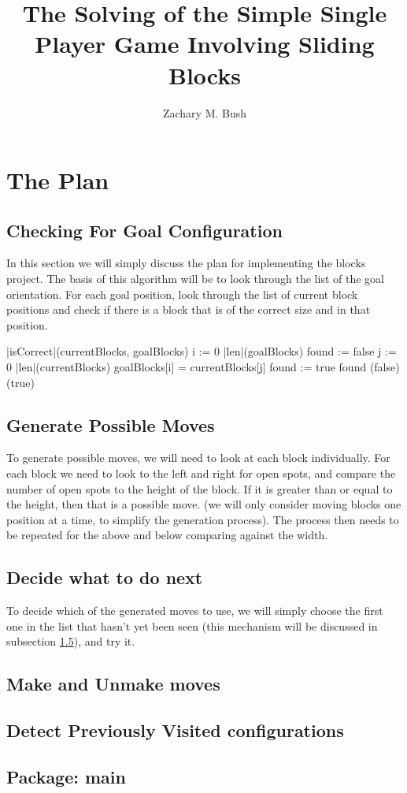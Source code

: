 \documentclass[a4paper]{article}
\newcommand{\sourceRoot}{../src/}
\newcommand{\myPackage}{}
\newcommand{\myJPackage}{}
\newcommand{\sourcePackage}[2]{\subsection*{Package: #2}\renewcommand{\myPackage}{#1}\renewcommand{\myJPackage}{#2}}
\newcommand{\sourceClass}[1]{}
\begin{document}
\title{The Solving of the Simple Single Player Game Involving Sliding Blocks}
\author{Zachary M. Bush}
\maketitle
\tableofcontents
\lstlistoflistings
\section{The Plan}
\subsection{Checking For Goal Configuration}
In this section we will simply discuss the plan for implementing the blocks project. The basis of this algorithm will be to look through the list of the goal orientation. For each goal position, look through the list of current block positions and check if there is a block that is of the correct size and in that position. 
\begin{program}
\PROC |isCorrect|(currentBlocks, goalBlocks) \BODY
\FOR i := 0 \TO |len|(goalBlocks) \DO
   found := false 
   \FOR j := 0 \TO |len|(currentBlocks) \DO
      \IF goalBlocks[i] = currentBlocks[j] \THEN found := true \FI
   \OD
   \IF \NOT found \THEN \EXIT(false) \FI {}
\OD
\EXIT(true)\ENDPROC
\end{program}
\subsection{Generate Possible Moves}
To generate possible moves, we will need to look at each block individually. For each block we need to look to the left and right for open spots, and compare the number of open spots to the height of the block. If it is greater than or equal to the height, then that is a possible move. (we will only consider moving blocks one position at a time, to simplify the generation process). The process then needs to be repeated for the above and below comparing against the width. 

\subsection{Decide what to do next}
To decide which of the generated moves to use, we will simply choose the first one in the list that hasn't yet been seen (this mechanism will be discussed in subsection \ref{ssec:checkDup}), and try it. 

\subsection{Make and Unmake moves}

\subsection{Detect Previously Visited configurations}
\label{ssec:checkDup}
\sourcePackage{.}{main}
\sourceClass{Solver.java}
\sourceClass{Solver.java}
\sourceClass{Solver.java}
\sourceClass{Solver.java}
\sourceClass{Solver.java}
\end{document}
